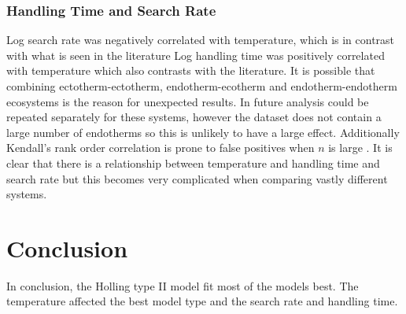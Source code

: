 \documentclass{article}
\begin{document}
\subsubsection{Handling Time and Search Rate}
Log search rate was negatively correlated with temperature, which is in contrast with what is seen in the literature %
Log handling time was positively correlated with temperature which also contrasts with the literature.  
It is possible that combining ectotherm-ectotherm, endotherm-ecotherm and endotherm-endotherm ecosystems is the reason for unexpected results. In future analysis could be repeated separately for these systems, however the dataset does not contain a large number of endotherms so this is unlikely to have a large effect. 
Additionally Kendall's rank order correlation is prone to false positives when $n$ is large \cite{Dytham2011ChoosingEdition}.
It is clear that there is a relationship between temperature and handling time and search rate but this becomes very complicated when comparing vastly different systems. 

\section{Conclusion}
In conclusion, the Holling type II model fit most of the models best. The temperature affected the best model type and the search rate and handling time.  
\clearpage{}

\printbibliography
\end{document}
